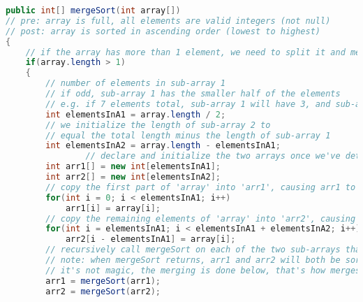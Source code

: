 \documentclass[main]{subfiles}
\begin{document}
\scriptsize
{}
\begin{lstlisting}[language=Java]
public int[] mergeSort(int array[])
// pre: array is full, all elements are valid integers (not null)
// post: array is sorted in ascending order (lowest to highest)
{
	// if the array has more than 1 element, we need to split it and merge the sorted halves
	if(array.length > 1)
	{
		// number of elements in sub-array 1
		// if odd, sub-array 1 has the smaller half of the elements
		// e.g. if 7 elements total, sub-array 1 will have 3, and sub-array 2 will have 4
		int elementsInA1 = array.length / 2;
		// we initialize the length of sub-array 2 to
		// equal the total length minus the length of sub-array 1
		int elementsInA2 = array.length - elementsInA1;
                // declare and initialize the two arrays once we've determined their sizes
		int arr1[] = new int[elementsInA1];
		int arr2[] = new int[elementsInA2];
		// copy the first part of 'array' into 'arr1', causing arr1 to become full
		for(int i = 0; i < elementsInA1; i++)
			arr1[i] = array[i];
		// copy the remaining elements of 'array' into 'arr2', causing arr2 to become full
		for(int i = elementsInA1; i < elementsInA1 + elementsInA2; i++)
			arr2[i - elementsInA1] = array[i];
		// recursively call mergeSort on each of the two sub-arrays that we've just created
		// note: when mergeSort returns, arr1 and arr2 will both be sorted!
		// it's not magic, the merging is done below, that's how mergesort works :)
		arr1 = mergeSort(arr1);
		arr2 = mergeSort(arr2);
		

\end{lstlisting}
\end{document}

